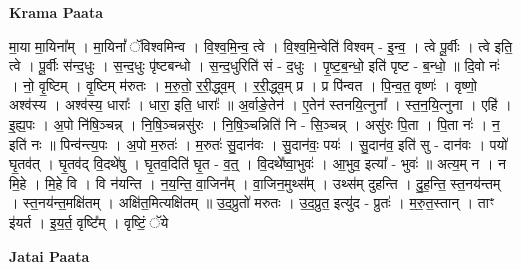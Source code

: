 \documentclass[17pt]{extarticle}
\begin{document}
\textbf{Krama Paata} \newline

मा॒या मा॒यिना᳚म् । मा॒यिनां᳚ ॅविश्वमिन्व । वि॒श्व॒मि॒न्व॒ त्वे । वि॒श्व॒मि॒न्वेति॑ विश्वम् - इ॒न्व॒ । त्वे पू॒र्वीः । त्वे इति॒ त्वे । पू॒र्वीः स॑न्द॒धुः । स॒न्द॒धुः पृ॑ष्टबन्धो । स॒न्द॒धुरिति॑ सं - द॒धुः । पृ॒ष्ट॒ब॒न्धो॒ इति॑ पृष्ट - ब॒न्धो॒ ॥ दि॒वो नः॑ । नो॒ वृ॒ष्टिम् । वृ॒ष्टिम् म॑रुतः । म॒रु॒तो॒ र॒री॒द्ध्व॒म् । र॒री॒द्ध्व॒म् प्र । प्र पि॑न्वत । पि॒न्व॒त॒ वृष्णः॑ । वृष्णो॒ अश्व॑स्य । अश्व॑स्य॒ धाराः᳚ । धारा॒ इति॒ धाराः᳚ ॥ अ॒र्वाङे॒तेन॑ । ए॒तेन॑ स्तनयि॒त्नुना᳚ । स्त॒न॒यि॒त्नुना । एहि॑ । इ॒ह्य॒पः । अ॒पो नि॑षि॒ञ्चन्न् । नि॒षि॒ञ्चन्नसु॑रः । नि॒षि॒ञ्चन्निति॑ नि - सि॒ञ्चन्न् । असु॑रः पि॒ता । पि॒ता नः॑ । न॒ इति॑ नः ॥ पिन्व॑न्त्य॒पः । अ॒पो म॒रुतः॑ । म॒रुतः॑ सु॒दान॑वः । सु॒दान॑वः॒ पयः॑ । सु॒दान॑व॒ इति॑ सु - दान॑वः । पयो॑ घृ॒तव॑त् । घृ॒तव॑द् वि॒दथे॑षु । घृ॒तव॒दिति॑ घृ॒त - व॒त्॒ । वि॒दथे᳚ष्वा॒भुवः॑ । आ॒भुव॒ इत्या᳚ - भुवः॑ ॥ अत्य॒म् न । न मि॒हे । मि॒हे वि । वि न॑यन्ति । न॒य॒न्ति॒ वा॒जिन᳚म् । वा॒जिन॒मुथ्स᳚म् । उथ्स॑म् दुहन्ति । दु॒ह॒न्ति॒ स्त॒नय॑न्तम् । स्त॒नय॑न्त॒मक्षि॑तम् । अक्षि॑त॒मित्यक्षि॑तम् ॥ उ॒द॒प्रुतो॑ मरुतः । उ॒द॒प्रुत॒ इत्यु॑द - प्रुतः॑ । म॒रु॒त॒स्तान् । ताꣳ इ॑यर्त । इ॒य॒र्त॒ वृष्टि᳚म् । वृष्टिं॒ ॅये \newline

\textbf{Jatai Paata} \newline
\end{document}
